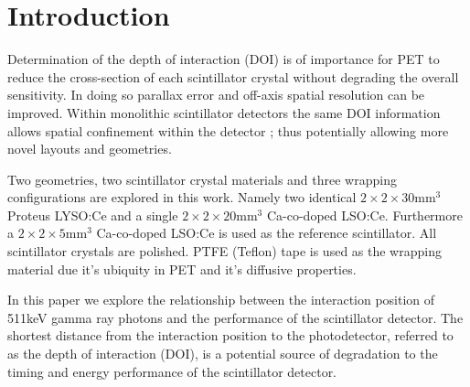 \section{Introduction} 
Determination of the depth of interaction (DOI) is of importance for PET to reduce the cross-section of each scintillator crystal without degrading the overall sensitivity\cite{Moses_2001}\cite{Humm_Rosenfeld_Del_Guerra_2003}. In doing so parallax error and off-axis spatial resolution can be improved. Within monolithic scintillator detectors the same DOI information allows spatial confinement within the detector \cite{am_Borghi_Seifert_Schaart_2013}\cite{Maas_Bruyndonckx_Schaart_2012}; thus potentially allowing more novel\cite{Dendooven_Lohner_Beekman_2009}\cite{n_der_Lei_van_Dam_Schaart_2013} layouts and geometries.

Two geometries, two scintillator crystal materials and three wrapping configurations are explored in this work. Namely two identical $2\times2\times30$mm$^3$ Proteus LYSO:Ce and a single $2\times2\times20$mm$^3$ Ca-co-doped LSO:Ce. Furthermore a $2\times2\times5$mm$^3$ Ca-co-doped LSO:Ce is used as the reference scintillator. All scintillator crystals are polished. PTFE (Teflon) tape is used as the wrapping material due it's ubiquity in PET and it's diffusive properties.

In this paper we explore the relationship between the interaction position of 511keV gamma ray photons and the performance of the scintillator detector. The shortest distance from the interaction position to the photodetector, referred to as the depth of interaction (DOI), is a potential source of degradation to the timing and energy performance of the scintillator detector.
